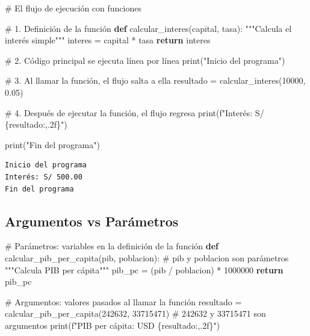 \documentclass[
  doc,
  floatsintext,
  longtable,
  a4paper,
  nolmodern,
  notxfonts,
  notimes,
  12pt,
  colorlinks=true,linkcolor=blue,citecolor=blue,urlcolor=blue]{apa7}
\newenvironment{Shaded}{\begin{snugshade}}{\end{snugshade}}
\newcommand{\BuiltInTok}[1]{\textcolor[rgb]{0.00,0.23,0.31}{#1}}
\newcommand{\CommentTok}[1]{\textcolor[rgb]{0.37,0.37,0.37}{#1}}
\newcommand{\ControlFlowTok}[1]{\textcolor[rgb]{0.00,0.23,0.31}{\textbf{#1}}}
\newcommand{\DecValTok}[1]{\textcolor[rgb]{0.68,0.00,0.00}{#1}}
\newcommand{\FloatTok}[1]{\textcolor[rgb]{0.68,0.00,0.00}{#1}}
\newcommand{\KeywordTok}[1]{\textcolor[rgb]{0.00,0.23,0.31}{\textbf{#1}}}
\newcommand{\NormalTok}[1]{\textcolor[rgb]{0.00,0.23,0.31}{#1}}
\newcommand{\OperatorTok}[1]{\textcolor[rgb]{0.37,0.37,0.37}{#1}}
\newcommand{\SpecialCharTok}[1]{\textcolor[rgb]{0.37,0.37,0.37}{#1}}
\newcommand{\SpecialStringTok}[1]{\textcolor[rgb]{0.13,0.47,0.30}{#1}}
\newcommand{\StringTok}[1]{\textcolor[rgb]{0.13,0.47,0.30}{#1}}
\begin{document}
\begin{Shaded}
\begin{Highlighting}[]
\CommentTok{\# El flujo de ejecución con funciones}

\CommentTok{\# 1. Definición de la función}
\KeywordTok{def}\NormalTok{ calcular\_interes(capital, tasa):}
    \CommentTok{"""Calcula el interés simple"""}
\NormalTok{    interes }\OperatorTok{=}\NormalTok{ capital }\OperatorTok{*}\NormalTok{ tasa}
    \ControlFlowTok{return}\NormalTok{ interes}

\CommentTok{\# 2. Código principal se ejecuta línea por línea}
\BuiltInTok{print}\NormalTok{(}\StringTok{"Inicio del programa"}\NormalTok{)}

\CommentTok{\# 3. Al llamar la función, el flujo salta a ella}
\NormalTok{resultado }\OperatorTok{=}\NormalTok{ calcular\_interes(}\DecValTok{10000}\NormalTok{, }\FloatTok{0.05}\NormalTok{)}

\CommentTok{\# 4. Después de ejecutar la función, el flujo regresa}
\BuiltInTok{print}\NormalTok{(}\SpecialStringTok{f"Interés: S/ }\SpecialCharTok{\{}\NormalTok{resultado}\SpecialCharTok{:,.2f\}}\SpecialStringTok{"}\NormalTok{)}

\BuiltInTok{print}\NormalTok{(}\StringTok{"Fin del programa"}\NormalTok{)}
\end{Highlighting}
\end{Shaded}

\begin{verbatim}
Inicio del programa
Interés: S/ 500.00
Fin del programa
\end{verbatim}

\subsection{Argumentos vs Parámetros}\label{argumentos-vs-paruxe1metros}

\begin{Shaded}
\begin{Highlighting}[]
\CommentTok{\# Parámetros: variables en la definición de la función}
\KeywordTok{def}\NormalTok{ calcular\_pib\_per\_capita(pib, poblacion):  }\CommentTok{\# pib y poblacion son parámetros}
    \CommentTok{"""Calcula PIB per cápita"""}
\NormalTok{    pib\_pc }\OperatorTok{=}\NormalTok{ (pib }\OperatorTok{/}\NormalTok{ poblacion) }\OperatorTok{*} \DecValTok{1000000}
    \ControlFlowTok{return}\NormalTok{ pib\_pc}

\CommentTok{\# Argumentos: valores pasados al llamar la función}
\NormalTok{resultado }\OperatorTok{=}\NormalTok{ calcular\_pib\_per\_capita(}\DecValTok{242632}\NormalTok{, }\DecValTok{33715471}\NormalTok{)  }\CommentTok{\# 242632 y 33715471 son argumentos}
\BuiltInTok{print}\NormalTok{(}\SpecialStringTok{f"PIB per cápita: USD }\SpecialCharTok{\{}\NormalTok{resultado}\SpecialCharTok{:,.2f\}}\SpecialStringTok{"}\NormalTok{)}
\end{Highlighting}
\end{Shaded}
\end{document}
